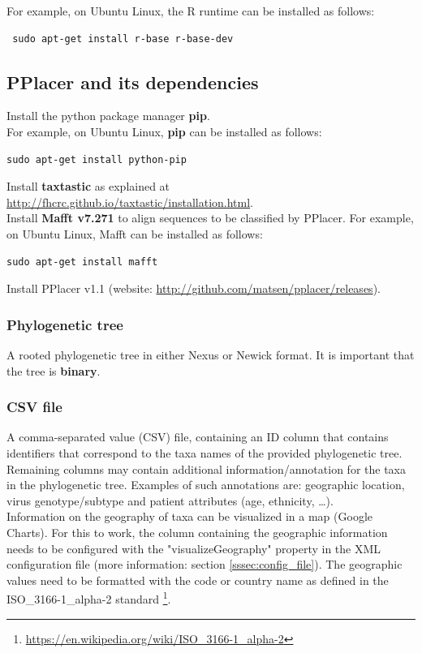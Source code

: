 \documentclass[a4paper, 11pt]{article} %
\begin{document}
\noindent For example, on Ubuntu Linux, the R runtime can be installed as follows:
\begin{verbatim}
 sudo apt-get install r-base r-base-dev
\end{verbatim}

\subsection*{PPlacer and its dependencies}
 Install the python package manager \textbf{pip}. \\

\noindent For example, on Ubuntu Linux, \textbf{pip} can be installed as follows:
\begin{verbatim}
sudo apt-get install python-pip
\end{verbatim}

\noindent Install \textbf{taxtastic} as explained at \url{http://fhcrc.github.io/taxtastic/installation.html}.\\

\noindent Install \textbf{Mafft v7.271} to align sequences to be classified by PPlacer. 
For example, on Ubuntu Linux, Mafft can be installed as follows:
\begin{verbatim}
sudo apt-get install mafft
\end{verbatim}

\noindent Install PPlacer v1.1 (website: \url{http://github.com/matsen/pplacer/releases}).

\subsubsection*{Phylogenetic tree}
A rooted phylogenetic tree in either Nexus or Newick format. It is important that the tree is \textbf{binary}.

\subsubsection*{CSV file}
A comma-separated value (CSV) file, containing an ID column that contains identifiers that correspond to the taxa names of the provided phylogenetic tree.
Remaining columns may contain additional information/annotation for the taxa in the phylogenetic tree. 
Examples of such annotations are: geographic location, virus genotype/subtype and patient attributes (age, ethnicity, \ldots). \\
Information on the geography of taxa can be visualized in a map (Google Charts). 
For this to work, the column containing the geographic information needs to be configured with the "visualizeGeography" property in the XML configuration file (more information: section \ref{sssec:config_file}). 
The geographic values need to be formatted with the code or country name as defined in the ISO\_3166-1\_alpha-2 standard \footnote{\url{https://en.wikipedia.org/wiki/ISO\_3166-1\_alpha-2}}.
\end{document}
